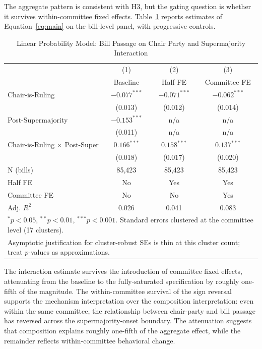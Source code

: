 \documentclass[11pt]{article}
\begin{document}
The aggregate pattern is consistent with H3, but the gating question is whether it survives within-committee fixed effects. Table~\ref{tab:fe} reports estimates of Equation~\ref{eq:main} on the bill-level panel, with progressive controls.

\begin{table}[ht]
\centering
\caption{Linear Probability Model: Bill Passage on Chair Party and Supermajority Interaction}
\label{tab:fe}
\begin{tabular}{lccc}
\toprule
& (1) & (2) & (3) \\
& Baseline & Half FE & Committee FE \\
\midrule
Chair-is-Ruling & $-0.077^{***}$ & $-0.071^{***}$ & $-0.062^{***}$ \\
& (0.013) & (0.012) & (0.014) \\
Post-Supermajority & $-0.153^{***}$ & n/a & n/a \\
& (0.011) & n/a & n/a \\
Chair-is-Ruling $\times$ Post-Super & $0.166^{***}$ & $0.158^{***}$ & $0.137^{***}$ \\
& (0.018) & (0.017) & (0.020) \\
\midrule
N (bills) & 85,423 & 85,423 & 85,423 \\
Half FE & No & Yes & Yes \\
Committee FE & No & No & Yes \\
Adj. $R^2$ & 0.026 & 0.041 & 0.083 \\
\bottomrule
\multicolumn{4}{l}{\footnotesize $^{*}p<0.05$, $^{**}p<0.01$, $^{***}p<0.001$. Standard errors clustered at the committee level (17 clusters).} \\
\multicolumn{4}{l}{\footnotesize Asymptotic justification for cluster-robust SEs is thin at this cluster count; treat $p$-values as approximations.} \\
\end{tabular}
\end{table}

The interaction estimate survives the introduction of committee fixed effects, attenuating from the baseline to the fully-saturated specification by roughly one-fifth of the magnitude. The within-committee survival of the sign reversal supports the mechanism interpretation over the composition interpretation: even within the same committee, the relationship between chair-party and bill passage has reversed across the supermajority-onset boundary. The attenuation suggests that composition explains roughly one-fifth of the aggregate effect, while the remainder reflects within-committee behavioral change.
\end{document}
